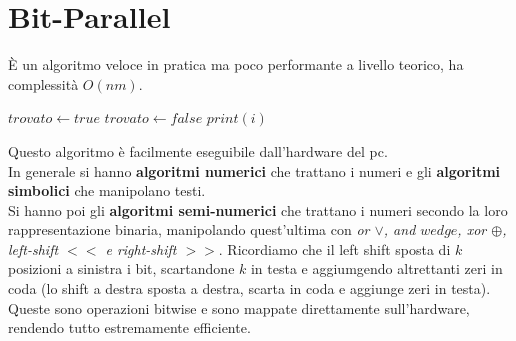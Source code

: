 \documentclass[a4paper,12pt, oneside]{book}
\begin{document}
\section{Bit-Parallel}
È un algoritmo veloce in pratica ma poco performante a livello
teorico, ha complessità $O(nm)$.
\begin{shaded}
  \begin{algorithm}
    \State $trovato \gets true$
    \State $trovato \gets false$
    \EndIf
    \EndFor
    \State $print(i)$
    \EndIf
    \EndFor
  \end{algorithm} 
\end{shaded}
Questo algoritmo è facilmente eseguibile dall'hardware del pc. \\
In generale si hanno \textbf{algoritmi numerici} che trattano i numeri
e gli \textbf{algoritmi simbolici} che manipolano testi.\\
Si hanno poi gli\textbf{ algoritmi semi-numerici} che trattano i
numeri secondo la loro rappresentazione binaria, manipolando quest'ultima
con \textit{or $\vee$, and $wedge$, xor $\oplus$, left-shift $<<$ e
  right-shift $>>$}. Ricordiamo che il left shift sposta di $k$
posizioni a sinistra i bit, scartandone $k$ in testa e aggiumgendo
altrettanti zeri in coda (lo shift a destra sposta a destra, scarta in
coda e aggiunge zeri in testa). Queste sono operazioni bitwise e sono
mappate direttamente sull'hardware, rendendo tutto estremamente
efficiente.\\
\end{document}
